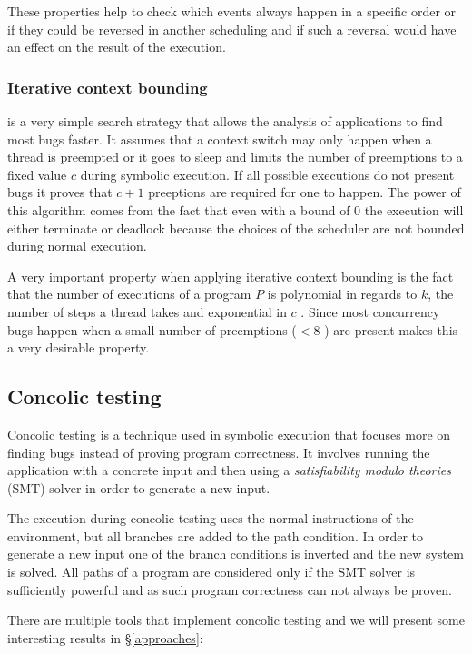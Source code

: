 \documentclass[10pt]{llncs}
\begin{document}
These properties help to check which events always happen in a specific order or if they could be reversed in another scheduling and if such a reversal would have an effect on the result of the execution.

\subsubsection{Iterative context bounding}

is a very simple search strategy that allows the analysis of applications to find most bugs faster. It assumes that a context switch may only happen when a thread is preempted or it goes to sleep and limits the number of preemptions to a fixed value $c$ during symbolic execution. If all possible executions do not present bugs it proves that $c+1$ preeptions are required for one to happen. The power of this algorithm comes from the fact that even with a bound of 0 the execution will either terminate or deadlock because the choices of the scheduler are not bounded during normal execution. 

A very important property when applying iterative context bounding is the fact that the number of executions of a program $P$ is polynomial in regards to $k$, the number of steps a thread takes and exponential in $c$ \cite{iterativecontextbound}. Since most concurrency bugs happen when a small number of preemptions ($ < 8$ \cite[§4.1]{iterativecontextbound}) are present makes this a very desirable property.

\subsection{Concolic testing}

Concolic testing is a technique used in symbolic execution that focuses more on finding bugs instead of proving program correctness. It involves running the application with a concrete input and then using a \emph{satisfiability modulo theories} (SMT) solver in order to generate a new input.

The execution during concolic testing uses the normal instructions of the environment, but all branches are added to the path condition. In order to generate a new input one of the branch conditions is inverted and the new system is solved. All paths of a program are considered only if the SMT solver is sufficiently powerful and as such program correctness can not always be proven.

There are multiple tools that implement concolic testing and we will present some interesting results in §\ref{approaches}:
\end{document}
